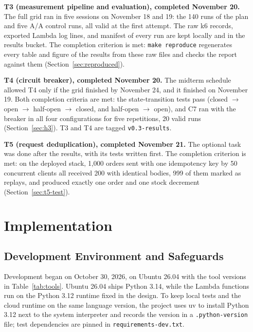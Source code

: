 \documentclass[10pt]{article}
\begin{document}
\textbf{T3 (measurement pipeline and evaluation), completed November 20.} The
full grid ran in five sessions on November 18 and 19: the 140 runs of the plan
and five A/A control runs, all valid at the first attempt. The raw k6 records,
exported Lambda log lines, and manifest of every run are kept locally and in
the results bucket. The completion criterion is met: \texttt{make reproduce}
regenerates every table and figure of the results from these raw files and
checks the report against them (Section~\ref{sec:reproduced}).

\textbf{T4 (circuit breaker), completed November 20.} The midterm schedule
allowed T4 only if the grid finished by November 24, and it finished on
November 19. Both completion criteria are met: the state-transition tests pass
(closed $\to$ open $\to$ half-open $\to$ closed, and half-open $\to$ open), and
C7 ran with the breaker in all four configurations for five repetitions, 20
valid runs (Section~\ref{sec:h3}). T3 and T4 are tagged
\texttt{v0.3-results}.

\textbf{T5 (request deduplication), completed November 21.} The optional task
was done after the results, with its tests written first. The completion
criterion is met: on the deployed stack, 1{,}000 orders sent with one
idempotency key by 50 concurrent clients all received 200 with identical
bodies, 999 of them marked as replays, and produced exactly one order and one
stock decrement (Section~\ref{sec:t5-test}).


\section{Implementation}

\subsection{Development Environment and Safeguards}
Development began on October 30, 2026, on Ubuntu 26.04 with the tool
versions in Table~\ref{tab:tools}. Ubuntu 26.04 ships Python 3.14, while the
Lambda functions run on the Python 3.12 runtime fixed in the design. To keep
local tests and the cloud runtime on the same language version, the project
uses uv to install Python 3.12 next to the system interpreter and records the
version in a \texttt{.python-version} file; test dependencies are pinned in
\texttt{requirements-dev.txt}.
\end{document}
